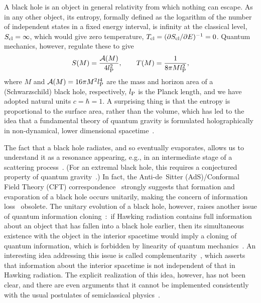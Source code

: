 \documentclass[12pt]{article}
\begin{document}
A black hole is an object in general relativity from which nothing 
can escape.  As in any other object, its entropy, formally defined 
as the logarithm of the number of independent states in a fixed 
energy interval, is infinity at the classical level, $S_{\rm cl} 
= \infty$, which would give zero temperature, $T_{\rm cl} = 
(\partial S_{\rm cl}/\partial E)^{-1} = 0$.  Quantum mechanics, 
however, regulate these to give~\cite{Bekenstein:1973ur,%
Hawking:1974rv,Hawking:1974sw}
%
\begin{equation}
  S(M) = \frac{{\cal A}(M)}{4 l_{\rm P}^2},
\qquad
  T(M) = \frac{1}{8\pi M l_{\rm P}^2},
\label{eq:BH-intro}
\end{equation}
%
where $M$ and ${\cal A}(M) = 16\pi M^2 l_{\rm P}^4$ are the mass 
and horizon area of a (Schwarzschild) black hole, respectively, 
$l_{\rm P}$ is the Planck length, and we have adopted natural 
units $c = \hbar = 1$.  A surprising thing is that the entropy 
is proportional to the surface area, rather than the volume, which 
has led to the idea that a fundamental theory of quantum gravity 
is formulated holographically in non-dynamical, lower dimensional 
spacetime~\cite{'tHooft:1993gx,Susskind:1994vu,Bousso:1999xy}.

The fact that a black hole radiates, and so eventually evaporates, 
allows us to understand it as a resonance appearing, e.g., in an 
intermediate stage of a scattering process~\cite{tHooft:1984kcu,%
Page:1993wv}.  (For an extremal black hole, this requires a 
conjectured property of quantum gravity~\cite{ArkaniHamed:2006dz}.) 
In fact, the Anti-de~Sitter (AdS)/Conformal Field Theory (CFT) 
correspondence~\cite{Maldacena:1997re,Gubser:1998bc,Witten:1998qj} 
strongly suggests that formation and evaporation of a black 
hole occurs unitarily, making the concern of information 
loss~\cite{Hawking:1976ra} obsolete.  The unitary evolution 
of a black hole, however, raises another issue of quantum 
information cloning~\cite{JP,Susskind:1993mu}:\ if Hawking 
radiation contains full information about an object that has 
fallen into a black hole earlier, then its simultaneous existence 
with the object in the interior spacetime would imply a cloning 
of quantum information, which is forbidden by linearity of quantum 
mechanics~\cite{Wootters:1982zz}.  An interesting idea addressing 
this issue is called complementarity~\cite{Susskind:1993if}, which 
asserts that information about the interior spacetime is not 
independent of that in Hawking radiation.  The explicit realization 
of this idea, however, has not been clear, and there are even 
arguments that it cannot be implemented consistently with the 
usual postulates of semiclassical physics~\cite{Almheiri:2012rt,%
Almheiri:2013hfa,Marolf:2013dba}.
\end{document}
